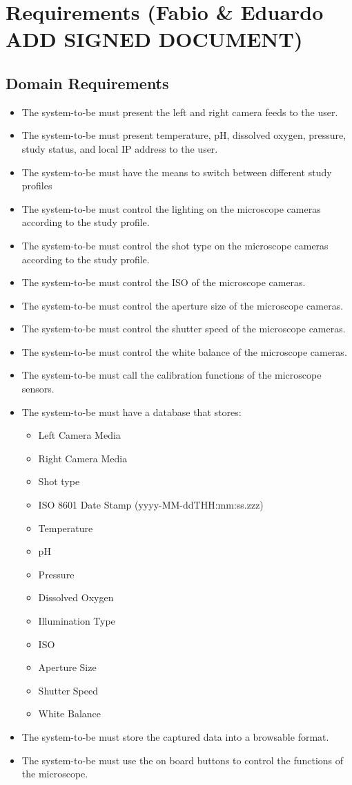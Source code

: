 \section{Requirements (Fabio \& Eduardo  ADD SIGNED DOCUMENT)}
\subsection{Domain Requirements}
\begin{itemize}
	\item The system-to-be must present the left and right camera feeds to the user.
	\item The system-to-be must present temperature, pH, dissolved oxygen, pressure, study status, and local IP address to the user.
	\item The system-to-be must have the means to switch between different study profiles
	\item The system-to-be must control the lighting on the microscope cameras according to the study profile.
	\item The system-to-be must control the shot type on the microscope cameras according to the study profile.
	\item The system-to-be must control the ISO of the microscope cameras.
	\item The system-to-be must control the aperture size of the microscope cameras.
	\item The system-to-be must control the shutter speed of the microscope cameras.
	\item The system-to-be must control the white balance of the microscope cameras.
	\item The system-to-be must call the calibration functions of the microscope sensors.
	\item The system-to-be must have a database that stores:
	      \begin{itemize}
		      \item Left Camera Media
		      \item Right Camera Media
		      \item Shot type
		      \item ISO 8601 Date Stamp (yyyy-MM-ddTHH:mm:ss.zzz)
		      \item Temperature
		      \item pH
		      \item Pressure
		      \item Dissolved Oxygen
		      \item Illumination Type
		      \item ISO
		      \item Aperture Size
		      \item Shutter Speed
		      \item White Balance
	      \end{itemize}
	\item The system-to-be must store the captured data into a browsable format.
	\item The system-to-be must use the on board buttons to control the functions of the microscope.
\end{itemize}
